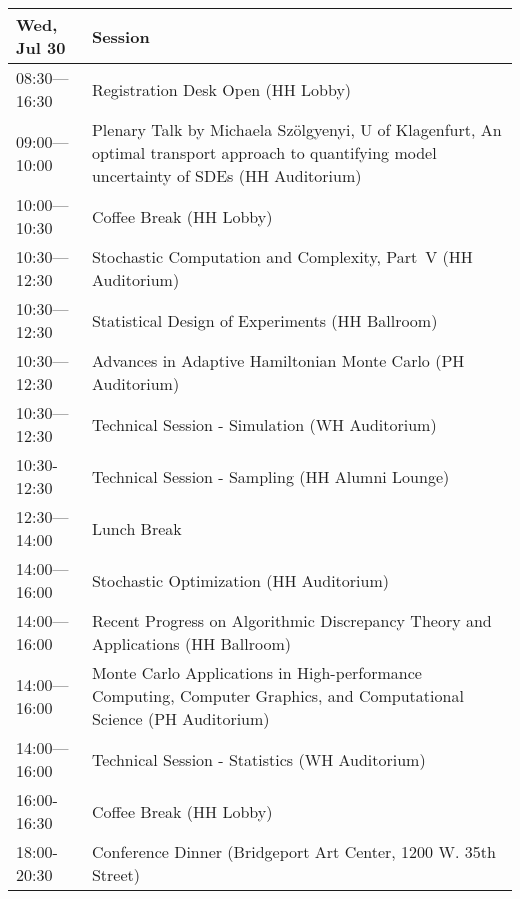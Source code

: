 \begin{table}
{\footnotesize
\begin{tabularx}{\textwidth}{>{\hsize=0.32\hsize}X|>{\hsize=1.7\hsize}X}
\hline
\textbf{Wed, Jul 30} & \textbf{Session} \\
\hline
\cellcolor{\EmptyColor}08:30---16:30 & \cellcolor{\EmptyColor}Registration Desk Open (HH Lobby) \\
\cellcolor{\PlenaryColor}09:00---10:00 & \cellcolor{\PlenaryColor}Plenary Talk by Michaela Sz\"olgyenyi, U of Klagenfurt, An optimal transport approach to quantifying model uncertainty of SDEs (HH Auditorium) \\
\cellcolor{\EmptyColor}10:00---10:30 & \cellcolor{\EmptyColor}Coffee Break (HH Lobby) \\
\cellcolor{\SessionTitleColor}10:30---12:30 & \cellcolor{\SessionTitleColor}Stochastic Computation and Complexity, Part~V (HH Auditorium) \\
\cellcolor{\SessionTitleColor}10:30---12:30 & \cellcolor{\SessionTitleColor}Statistical Design of Experiments (HH Ballroom) \\
\cellcolor{\SessionTitleColor}10:30---12:30 & \cellcolor{\SessionTitleColor}Advances in Adaptive Hamiltonian Monte Carlo (PH Auditorium) \\
\cellcolor{\SessionLightColor}10:30---12:30 & \cellcolor{\SessionLightColor}Technical Session - Simulation (WH Auditorium) \\
\cellcolor{\SessionLightColor}10:30-12:30 & \cellcolor{\SessionLightColor}Technical Session - Sampling (HH Alumni Lounge) \\
\cellcolor{\EmptyColor}12:30---14:00 & \cellcolor{\EmptyColor}Lunch Break \\
\cellcolor{\SessionTitleColor}14:00---16:00 & \cellcolor{\SessionTitleColor}Stochastic Optimization (HH Auditorium) \\
\cellcolor{\SessionTitleColor}14:00---16:00 & \cellcolor{\SessionTitleColor}Recent Progress on Algorithmic Discrepancy Theory and Applications (HH Ballroom) \\
\cellcolor{\SessionTitleColor}14:00---16:00 & \cellcolor{\SessionTitleColor}Monte Carlo Applications in High-performance Computing, Computer Graphics, and Computational Science (PH Auditorium) \\
\cellcolor{\SessionLightColor}14:00---16:00 & \cellcolor{\SessionLightColor}Technical Session - Statistics (WH Auditorium) \\
\cellcolor{\EmptyColor}16:00-16:30 & \cellcolor{\EmptyColor}Coffee Break (HH Lobby) \\
\cellcolor{\EmptyColor}18:00-20:30 & \cellcolor{\EmptyColor}Conference Dinner (Bridgeport Art Center, 1200 W. 35th Street) \\
\hline
\end{tabularx}
}
\end{table}

